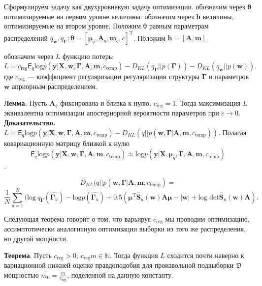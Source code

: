 Сформулируем задачу как двухуровневую задачу оптимизации. обозначим через  $\boldsymbol{\theta}$ оптимизируемые на первом уровне величины. обозначим через $\mathbf{h}$ величины, оптимизируемые на втором уровне.
Положим $\boldsymbol{\theta}$ равным параметрам распределений $q_{\mathbf{w}}, q_{\boldsymbol{\Gamma}}: \boldsymbol{\theta} = [\boldsymbol{\mu}_q, \mathbf{A}_q, \mathbf{m}_q, c]^\text{T}$.  
Положим $\mathbf{h} = [\mathbf{A}, \mathbf{m}].$

обозначим через $L$ функцию потерь:
\begin{equation}
    L = c_{\text{reg}}{\mathsf{E}_{q}}\text{log} p(\mathbf{y}|\mathbf{X},\mathbf{w}, \boldsymbol{\Gamma}, \mathbf{A},\mathbf{m}, c_{\text{temp}})
 - {D_{KL}}(q_{\boldsymbol{\Gamma}}||p(\boldsymbol{\Gamma})) - {D_{KL}}(q_{\mathbf{w}}||p(\mathbf{w})),
\end{equation}
где $c_{\text{reg}}$ --- коэффициент регуляризации регуляризации структуры $\boldsymbol{\Gamma}$ и параметров $\mathbf{w}$ априорным распределением.

\textbf{Лемма.}  Пусть $\mathbf{A}_q$ фиксирована и близка к нулю, $c_{\text{reg}} =1$.  Тогда максимизация $L$ эквивалентна оптимизации апостериорной вероятности параметров при $c \to 0$.\\
\textbf{Доказательство.} 
$L = \mathsf{E}_{q}\text{log} p(\mathbf{y}|\mathbf{X},\mathbf{w}, \boldsymbol{\Gamma}, \mathbf{A},\mathbf{m}, c_{\text{temp}}) - {D_{KL}}(q||p(\mathbf{w}, \boldsymbol{\Gamma}| \mathbf{A},\mathbf{m}, c_{\text{temp}})).$
Полагая ковариационную матрицу близкой к нулю $$ \mathsf{E}_{q}\text{log} p(\mathbf{y}|\mathbf{X},\mathbf{w}, \boldsymbol{\Gamma}, \mathbf{A},\mathbf{m}, c_{\text{temp}}) \approx \text{log} p(\mathbf{y}|\mathbf{X},\boldsymbol{\mu}_q, \boldsymbol{\Gamma}, \mathbf{A},\mathbf{m}, c_{\text{temp}})$$.

$$
   {D_{KL}}(q||p(\mathbf{w}, \boldsymbol{\Gamma}| \mathbf{A},\mathbf{m}, c_{\text{temp}}) = 
$$
$$
    \frac{1}{N}\sum_{u=1}^N (\text{log}~q_{\boldsymbol{\Gamma}}(\hat{\boldsymbol{\Gamma}_u}) - \text{log}p(\hat{\boldsymbol{\Gamma}_u}) + 0.5(\boldsymbol{\mu}^{\text{T}}\hat{\mathbf{S}}_u(\mathbf{w})\mathbf{A}\boldsymbol{\mu} - |\mathbf{w}| + \text{log det}\hat{\mathbf{S}}_u(\mathbf{w})\mathbf{A}).
$$

Следующая теорема говорит о том, что варьируя $c_{\text{reg}}$ мы проводим оптимизацию, ассимптотически аналогичную оптимизации выборки из того же распределения, но другой мощности.

\textbf{Теорема}. Пусть $c_{\text{reg}} > 0$, $c_{\text{reg}} m \in \mathbb{N}.$
Тогда функция $L$ сходится почти наверно к вариационной нижней оценке правдоподобия для произвольной подвыборки  $\mathfrak{D}$ 
мощностью $m_0 = \frac{m}{c_{\text{reg}}}$, поделенной на данную константу.\\

